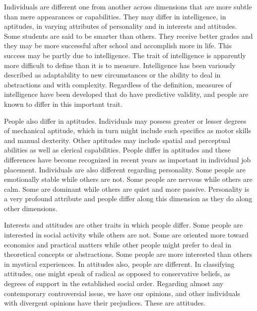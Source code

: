 Individuals are different one from another across dimensions that are more subtle than mere appearances or capabilities. They may differ in intelligence, in aptitudes, in varying attributes of personality and in interests and attitudes. Some students are said to be smarter than others. They receive better grades and they may be more successful after school and accomplish more in life. This success may be partly due to intelligence. The trait of intelligence is apparently more difficult to define than it is to measure. Intelligence has been variously described as adaptability to new circumstances or the ability to deal in abstractions and with complexity. Regardless of the definition, measures of intelligence have been developed that do have predictive validity, and people are known to differ in this important trait.

People also differ in aptitudes. Individuals may possess greater or lesser degrees of mechanical aptitude, which in turn might include such specifics as motor skills and manual dexterity. Other aptitudes may include spatial and perceptual abilities as well as clerical capabilities. People differ in aptitudes and these differences have become recognized in recent years as important in individual job placement. Individuals are also different regarding personality. Some people are emotionally stable while others are not. Some people are nervous while others are calm. Some are dominant while others are quiet and more passive. Personality is a very profound attribute and people differ along this dimension as they do along other dimensions.

Interests and attitudes are other traits in which people differ. Some people are interested in social activity while others are not. Some are oriented more toward economics and practical matters while other people might prefer to deal in theoretical concepts or abstractions. Some people are more interested than others in mystical experiences. In attitudes also, people are different. In classifying attitudes, one might speak of radical as opposed to conservative beliefs, as degrees of support in the established social order. Regarding almost any contemporary controversial issue, we have our opinions, and other individuals with divergent opinions have their prejudices. These are attitudes.

